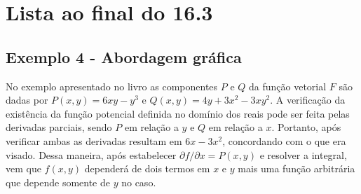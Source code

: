 \documentclass[a4paper, 12pt, brazilian]{article}
\begin{document}
	\section{Lista ao final do 16.3}
	
	\subsection{Exemplo 4 - Abordagem gráfica}
	
	No exemplo apresentado no livro as componentes $P$ e $Q$ da função vetorial $F$ são dadas por $P(x,y)=6xy-y^{3}$ e $Q(x,y)=4y+3x^{2}-3xy^{2}$. A verificação da existência da função potencial definida no domínio dos reais pode ser feita pelas derivadas parciais, sendo $P$ em relação a $y$ e $Q$ em relação a $x$. Portanto, após verificar ambas as derivadas resultam em $6x-3x^{2}$, concordando com o que era visado. Dessa maneira, após estabelecer $\partial f/\partial x=P(x,y)$ e resolver a integral, vem que $f(x,y)$ dependerá de dois termos em $x$ e $y$ mais uma função arbitrária que depende somente de $y$ no caso. 
	
\end{document}
